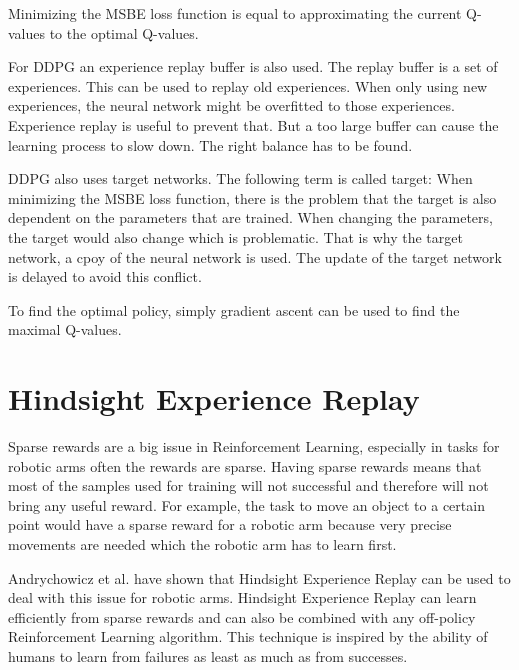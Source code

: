 
Minimizing the MSBE loss function is equal to approximating the current Q-values to the optimal Q-values.

\vspace{0.5cm}

For DDPG an experience replay buffer is also used. The replay buffer is a set of experiences. This can be used to replay old experiences. When only using new experiences, the neural network might be overfitted to those experiences. Experience replay is useful to prevent that. But a too large buffer can cause the learning process to slow down. The right balance has to be found.

DDPG also uses target networks. The following term is called target:
When minimizing the MSBE loss function, there is the problem that the target is also dependent on the parameters that are trained. When changing the parameters, the target would also change which is problematic. That is why the target network, a cpoy of the neural network is used. The update of the target network is delayed to avoid this conflict.

\vspace{0.5cm}

To find the optimal policy, simply gradient ascent can be used to find the maximal Q-values.





\section{Hindsight Experience Replay}



Sparse rewards are a big issue in Reinforcement Learning, especially in tasks for robotic arms often the rewards are sparse. Having sparse rewards means that most of the samples used for training will not successful and therefore will not bring any useful reward. For example, the task to move an object to a certain point would have a sparse reward for a robotic arm because very precise movements are needed which the robotic arm has to learn first.
 
\vspace{0.5cm}
 
Andrychowicz et al. have shown that Hindsight Experience Replay can be used to deal with this issue for robotic arms. 
Hindsight Experience Replay can learn efficiently from sparse rewards and can also be combined with any off-policy Reinforcement Learning algorithm.
This technique is inspired by the ability of humans to learn from failures as least as much as from successes.

